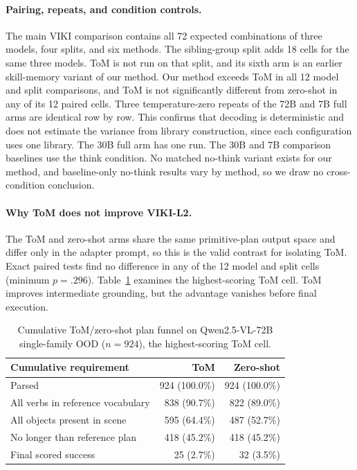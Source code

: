 \documentclass{article}
\theoremstyle{plain}
\theoremstyle{definition}
\theoremstyle{remark}
\begin{document}
\paragraph{Pairing, repeats, and condition controls.}
The main VIKI comparison contains all 72 expected combinations of three models, four splits, and six methods. The sibling-group split adds 18 cells for the same three models. ToM is not run on that split, and its sixth arm is an earlier skill-memory variant of our method. Our method exceeds ToM in all 12 model and split comparisons, and ToM is not significantly different from zero-shot in any of its 12 paired cells. Three temperature-zero repeats of the 72B and 7B full arms are identical row by row. This confirms that decoding is deterministic and does not estimate the variance from library construction, since each configuration uses one library. The 30B full arm has one run. The 30B and 7B comparison baselines use the think condition. No matched no-think variant exists for our method, and baseline-only no-think results vary by method, so we draw no cross-condition conclusion.

\paragraph{Why ToM does not improve VIKI-L2.}
The ToM and zero-shot arms share the same primitive-plan output space and differ only in the adapter prompt, so this is the valid contrast for isolating ToM. Exact paired tests find no difference in any of the 12 model and split cells (minimum $p=.296$). Table~\ref{tab:tom_funnel} examines the highest-scoring ToM cell. ToM improves intermediate grounding, but the advantage vanishes before final execution.

\begin{table}[h]
\centering
\caption{Cumulative ToM/zero-shot plan funnel on Qwen2.5-VL-72B single-family OOD ($n=924$), the highest-scoring ToM cell.}
\label{tab:tom_funnel}
\small
\begin{tabular}{@{}lrr@{}}
\toprule
\textbf{Cumulative requirement} & \textbf{ToM} & \textbf{Zero-shot} \\
\midrule
Parsed & 924 (100.0\%) & 924 (100.0\%) \\
All verbs in reference vocabulary & 838 (90.7\%) & 822 (89.0\%) \\
All objects present in scene & 595 (64.4\%) & 487 (52.7\%) \\
No longer than reference plan & 418 (45.2\%) & 418 (45.2\%) \\
Final scored success & 25 (2.7\%) & 32 (3.5\%) \\
\bottomrule
\end{tabular}
\end{table}
\end{document}
